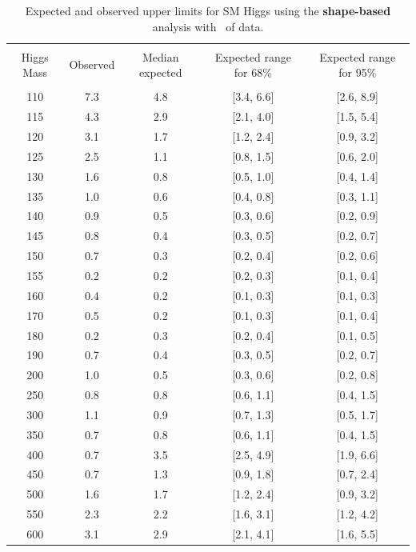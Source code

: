 \begin{table}[hbp!]
\begin{center}
\begin{tabular}{c c c c c}
\hline
\vspace{-3mm} && \\
 Higgs Mass & Observed  & Median expected & Expected range for 68\% & Expected range for 95\%   \\
\vspace{-3mm} && \\
\hline
110 & 7.3 & 4.8 & [3.4, 6.6] & [2.6, 8.9] \\
115 & 4.3 & 2.9 & [2.1, 4.0] & [1.5, 5.4] \\
120 & 3.1 & 1.7 & [1.2, 2.4] & [0.9, 3.2] \\
125 & 2.5 & 1.1 & [0.8, 1.5] & [0.6, 2.0] \\
130 & 1.6 & 0.8 & [0.5, 1.0] & [0.4, 1.4] \\
135 & 1.0 & 0.6 & [0.4, 0.8] & [0.3, 1.1] \\
140 & 0.9 & 0.5 & [0.3, 0.6] & [0.2, 0.9] \\
145 & 0.8 & 0.4 & [0.3, 0.5] & [0.2, 0.7] \\
150 & 0.7 & 0.3 & [0.2, 0.4] & [0.2, 0.6] \\
155 & 0.2 & 0.2 & [0.2, 0.3] & [0.1, 0.4] \\
160 & 0.4 & 0.2 & [0.1, 0.3] & [0.1, 0.3] \\
170 & 0.5 & 0.2 & [0.1, 0.3] & [0.1, 0.4] \\
180 & 0.2 & 0.3 & [0.2, 0.4] & [0.1, 0.5] \\
190 & 0.7 & 0.4 & [0.3, 0.5] & [0.2, 0.7] \\
200 & 1.0 & 0.5 & [0.3, 0.6] & [0.2, 0.8] \\
250 & 0.8 & 0.8 & [0.6, 1.1] & [0.4, 1.5] \\
300 & 1.1 & 0.9 & [0.7, 1.3] & [0.5, 1.7] \\
350 & 0.7 & 0.8 & [0.6, 1.1] & [0.4, 1.5] \\
400 & 0.7 & 3.5 & [2.5, 4.9] & [1.9, 6.6] \\
450 & 0.7 & 1.3 & [0.9, 1.8] & [0.7, 2.4] \\
500 & 1.6 & 1.7 & [1.2, 2.4] & [0.9, 3.2] \\
550 & 2.3 & 2.2 & [1.6, 3.1] & [1.2, 4.2] \\
600 & 3.1 & 2.9 & [2.1, 4.1] & [1.6, 5.5] \\
\hline
\end{tabular}
\caption{Expected and observed upper limits for SM Higgs using the
  {\bf shape-based} analysis with \intlumiEightTeV\ of data.}
\label{tab:mvabase_uls}
\end{center}
\end{table}
